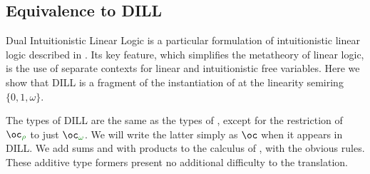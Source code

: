 \subsection{Equivalence to DILL}

Dual Intuitionistic Linear Logic is a particular formulation of intuitionistic
linear logic described in \cite{Barber 1996}.
Its key feature, which simplifies the metatheory of linear logic, is the use of
separate contexts for linear and intuitionistic free variables.
Here we show that DILL is a fragment of the instantiation of \name{} at the
linearity semiring $\{0,1,\omega\}$.

The types of DILL are the same as the types of \name, except for the
restriction of $\excl{\rho}{}$ to just $\excl{\omega}{}$.
We will write the latter simply as $\oc$ when it appears in DILL.
We add sums and with products to the calculus of \cite{Barber1996}, with the
obvious rules.
These additive type formers present no additional difficulty to the translation.


